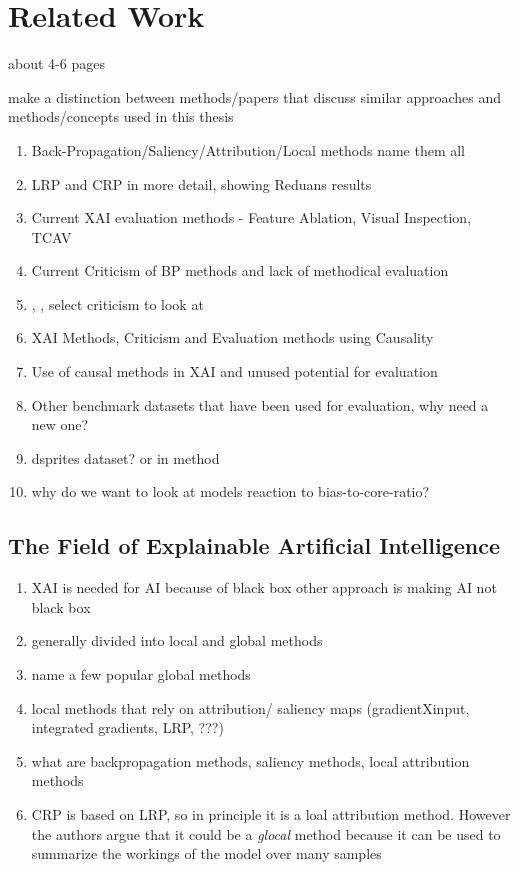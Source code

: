 
\chapter{Related Work}\label{chapter:related_work}


{\color{red}
      about 4-6 pages

      make a distinction between methods/papers that discuss similar approaches and methods/concepts used in this thesis}

\begin{enumerate}
      \item Back-Propagation/Saliency/Attribution/Local methods name them all
      \item LRP and CRP in more detail, showing Reduans results
      \item Current XAI evaluation methods - Feature Ablation, Visual Inspection, TCAV
      \item Current Criticism of BP methods and lack of methodical evaluation
      \item \cite{Sixt2020}, \cite{Wilming2023}, \cite{Kindermans2019} select criticism to look at
      \item XAI Methods, Criticism and Evaluation methods using Causality
      \item Use of causal methods in XAI and unused potential for evaluation
      \item Other benchmark datasets that have been used for evaluation, why need a new one?
      \item dsprites dataset? or in method
      \item why do we want to look at models reaction to bias-to-core-ratio?
\end{enumerate}


\section{The Field of Explainable Artificial Intelligence}


\begin{enumerate}
      \item XAI is needed for AI because of black box other approach is making AI not black box
      \item generally divided into local and global methods
      \item name a few popular global methods
      \item local methods that rely on attribution/ saliency maps (gradientXinput, integrated gradients, LRP, ???)
      \item what are backpropagation methods, saliency methods, local attribution methods
      \item CRP is based on LRP, so in principle it is a loal attribution method.
            However the authors argue that it could be a \textit{glocal} method because it can be used to summarize the workings of the model over many samples
\end{enumerate}


